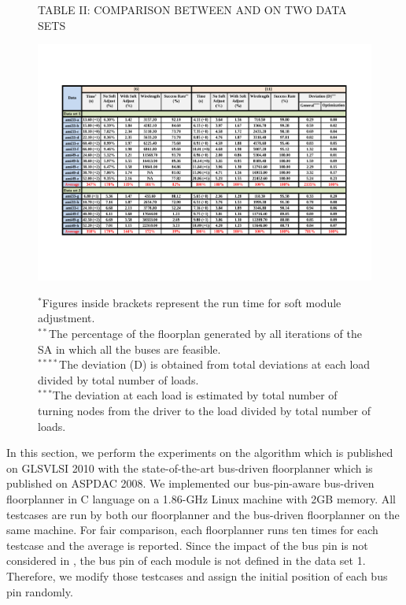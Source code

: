 \begin{figure}[htb]
  \centering
  \scriptsize
   TABLE II: COMPARISON BETWEEN \cite{Ma08} AND \cite{PH10} ON TWO DATA SETS
    \centerline{\includegraphics[width=17cm]{Fig/Table_2.pdf}}
   $^*$Figures inside brackets represent the run time for soft module adjustment.\\
   $^{**}$The percentage of the floorplan generated by all iterations of the SA in which all the buses are feasible.\\
   $^{****}$The deviation (D) is obtained from total deviations at each load divided by total number of loads.\\
   $^{***}$The deviation at each load is estimated by total number of turning nodes from the driver to the load divided by total number of loads.
  \label{fig::TABLE_II}
\end{figure}

In this section, we perform the experiments on the algorithm which
is published on GLSVLSI 2010 with the state-of-the-art bus-driven
floorplanner \cite{Ma08} which is published on ASPDAC 2008.
We implemented our bus-pin-aware bus-driven floorplanner in C
language on a 1.86-GHz Linux machine with 2GB memory. All
testcases are run by both our floorplanner and the
bus-driven floorplanner \cite{Ma08} on the same
machine. For fair comparison, each floorplanner runs ten times for
each testcase and the average is reported. Since the impact of the bus pin
is not considered in \cite{Ma08},
the bus pin of each module is not defined in the data set 1.
Therefore, we modify those testcases and assign the initial position
of each bus pin randomly.

